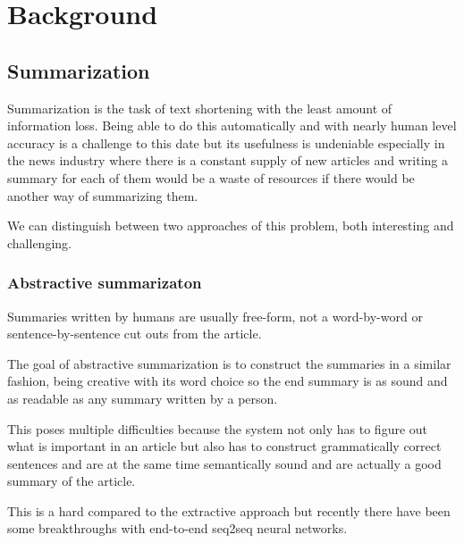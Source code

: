\chapter{Background}\label{sect:Background}
\section{Summarization}
Summarization is the task of text shortening with the least amount of information loss. Being able to do this automatically and with nearly human level accuracy is a challenge to this date but its usefulness is undeniable especially in the news industry where there is a constant supply of new articles and writing a summary for each of them would be a waste of resources if there would be another way of summarizing them.

We can distinguish between two approaches of this problem, both interesting and challenging.

\subsection{Abstractive summarizaton}
Summaries written by humans are usually free-form, not a word-by-word or sentence-by-sentence cut outs from the article.

The goal of abstractive summarization is to construct the summaries in a similar fashion, being creative with its word choice so the end summary is as sound and as readable as any summary written by a person.

This poses multiple difficulties because the system not only has to figure out what is important in an article but also has to construct grammatically correct sentences and are at the same time semantically sound and are actually a good summary of the article.

This is a hard compared to the extractive approach but recently there have been some breakthroughs with end-to-end seq2seq neural networks.


